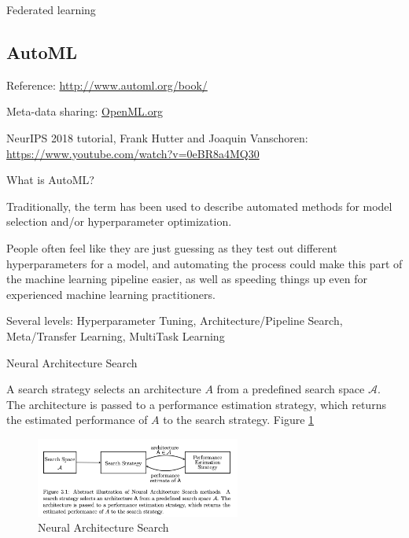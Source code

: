\documentclass[english]{article}
\begin{document}
\item Federated learning



\eenum 



\subsection{AutoML}


\benum 

\item Reference: \url{http://www.automl.org/book/}

Meta-data sharing: \url{OpenML.org}

NeurIPS 2018 tutorial, Frank Hutter and Joaquin Vanschoren: \url{https://www.youtube.com/watch?v=0eBR8a4MQ30}


\item What is AutoML?

Traditionally, the term has been used to describe automated methods for model selection and/or hyperparameter optimization.

People often feel like they are just guessing as they test out different hyperparameters for a model, and automating the process could make this part of the machine learning pipeline easier, as well as speeding things up even for experienced machine learning practitioners.

\item Several levels: Hyperparameter Tuning, Architecture/Pipeline Search, Meta/Transfer Learning, MultiTask Learning

\item Neural Architecture Search

\benum 
\item A search strategy selects an architecture $A$ from a predefined search space $\mathcal{A}$. The architecture is passed to a performance estimation strategy, which returns the estimated performance of $A$ to the search strategy. Figure \ref{nas} 

\begin{figure}[h!]
  \centering
  \includegraphics[width=0.6\textwidth]{nas.png}
  \caption{Neural Architecture Search}
  \label{nas}
\end{figure}
\end{document}
